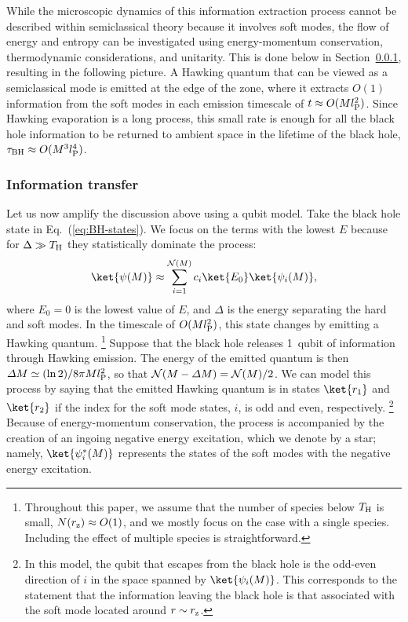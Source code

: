 \documentclass[12pt]{article}
\begin{document}
While the microscopic dynamics of this information extraction 
process cannot be described within semiclassical theory 
because it involves soft modes, the flow of energy and entropy 
can be investigated using energy-momentum conservation, 
thermodynamic considerations, and unitarity.  This is done 
below in Section~\ref{subsubsec:transf}, resulting in the 
following picture.  A Hawking quantum that can be viewed 
as a semiclassical mode is emitted at the edge of the zone, 
where it extracts $O(1)$ information from the soft modes in 
each emission timescale of $t \approx O(M l_{\rm P}^2)$.  Since 
Hawking evaporation is a long process, this small rate is enough 
for all the black hole information to be returned to ambient 
space in the lifetime of the black hole, $\tau_{\rm BH} \approx 
O(M^3 l_{\rm P}^4)$.

\subsubsection{Information transfer}
\label{subsubsec:transf}

Let us now amplify the discussion above using a qubit model.  Take 
the black hole state in Eq.~(\ref{eq:BH-states}).  We focus on the 
terms with the lowest $E$ because for $\Delta \gg T_{\rm H}$ they 
statistically dominate the process:
%
\begin{equation}
  \ket{\psi(M)} \approx \sum_{i = 1}^{{\cal N}(M)} 
      c_i \ket{E_0} \ket{\psi_i(M)},
\label{eq:BH-states-0}
\end{equation}
%
where $E_0 = 0$ is the lowest value of $E$, and $\Delta$ is the 
energy separating the hard and soft modes.  In the timescale 
of $O(M l_{\rm P}^2)$, this state changes by emitting a Hawking 
quantum.%
\footnote{Throughout this paper, we assume that the number of species 
 below $T_{\rm H}$ is small, $N(r_{\rm z}) \approx O(1)$, and we 
 mostly focus on the case with a single species.  Including the 
 effect of multiple species is straightforward.}
Suppose that the black hole releases 1~qubit of information 
through Hawking emission.  The energy of the emitted quantum 
is then $\varDelta M \simeq (\ln 2)/8\pi M l_{\rm P}^2$, so that 
${\cal N}(M-\varDelta M) = {\cal N}(M)/2$.  We can model this 
process by saying that the emitted Hawking quantum is in states 
$\ket{r_1}$ and $\ket{r_2}$ if the index for the soft mode states, 
$i$, is odd and even, respectively.%
\footnote{In this model, the qubit that escapes from the black 
 hole is the odd-even direction of $i$ in the space spanned by 
 $\ket{\psi_i(M)}$.  This corresponds to the statement that the 
 information leaving the black hole is that associated with the 
 soft mode located around $r \sim r_{\rm z}$.}
Because of energy-momentum conservation, the process is accompanied 
by the creation of an ingoing negative energy excitation, which 
we denote by a star; namely, $\ket{\psi^*_i(M)}$ represents the 
states of the soft modes with the negative energy excitation.
\end{document}
